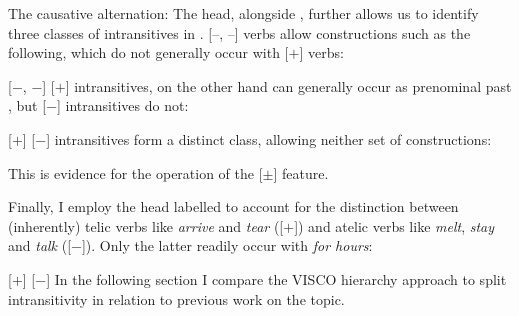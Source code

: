 \documentclass[output=paper]{langsci/langscibook}
\begin{document}
\ea The causative alternation:
    \ea
        \z
    \ex
        \z
    \ex
        \z
    \ex
        \z
    \z
\z
The \Change{} head, alongside \State{}, further allows us to identify three classes
of intransitives in . [$–$\State{}, $–$\Change{}] verbs allow constructions
such as the following, which do not generally occur with [$+$\Change{}] verbs:

\ea
    \ea {}[$-$\State{}, $-$\Change{}]
        \z
    \ex {}[$+$\Change{}]
        \z
    \z
\z
[$+$\Change{}] intransitives, on the other hand can generally occur as prenominal
past , but [$-$\Change{}] intransitives do not:

\ea
    \ea {}[$+$\Change{}]
        \z
    \ex {}[$-$\Change{}]
        \z
    \z
\z
[$+$\State{}] intransitives form a distinct class, allowing neither set of
constructions:

\ea
    \z
\z
This is evidence for the operation of the [$\pm$\State{}] feature.

Finally, I employ the head labelled \Oriented{} to account for the distinction
between (inherently) telic verbs like \emph{arrive} and \emph{tear}
([$+$\Oriented{}]) and atelic verbs like \emph{melt}, \emph{stay} and
\emph{talk} ([$-$\Oriented{}]). Only the latter readily occur with \emph{for
hours}:

\ea
    \ea {}[$+$\Oriented{}]
        \z
    \ex {}[$-$\Oriented{}]
        \z
    \z
\z
In the following section I compare the VISCO hierarchy approach to split
intransitivity in relation to previous work on the topic.
\end{document}
